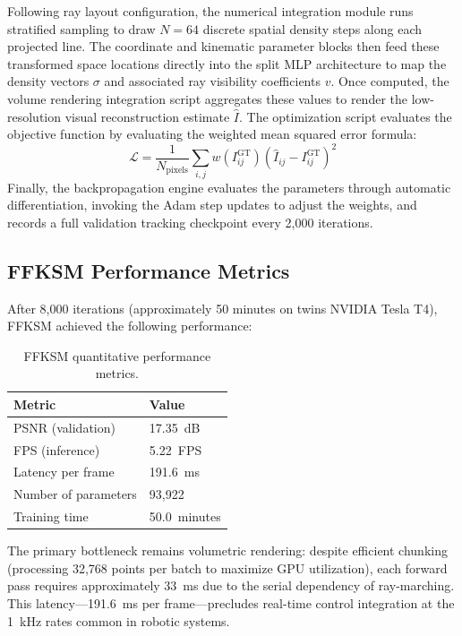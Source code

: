 \documentclass[12pt,a4paper,oneside]{report}
\begin{document}
Following ray layout configuration, the numerical integration module runs stratified sampling to draw $N=64$ discrete spatial density steps along each projected line. The coordinate and kinematic parameter blocks then feed these transformed space locations directly into the split MLP architecture to map the density vectors $\sigma$ and associated ray visibility coefficients $v$. Once computed, the volume rendering integration script aggregates these values to render the low-resolution visual reconstruction estimate $\hat{I}$. The optimization script evaluates the objective function by evaluating the weighted mean squared error formula:
\begin{equation}
\mathcal{L} = \frac{1}{N_{\text{pixels}}} \sum_{i,j} w(I_{ij}^{\text{GT}}) (\hat{I}_{ij} - I_{ij}^{\text{GT}})^2
\end{equation}
Finally, the backpropagation engine evaluates the parameters through automatic differentiation, invoking the Adam step updates to adjust the weights, and records a full validation tracking checkpoint every 2,000 iterations.

\subsection{FFKSM Performance Metrics}
After 8,000 iterations (approximately 50 minutes on twins NVIDIA Tesla T4), FFKSM achieved the following performance:
\begin{table}[H]
\centering
\caption{FFKSM quantitative performance metrics.}
\label{tab:ffksm_performance}
\begin{tabular}{ll}
\toprule
\textbf{Metric} & \textbf{Value} \\
\midrule
PSNR (validation) & 17.35~dB \\
FPS (inference) & 5.22~FPS \\
Latency per frame & 191.6~ms \\
Number of parameters & 93,922 \\
Training time & 50.0~minutes \\
\bottomrule
\end{tabular}
\end{table}

The primary bottleneck remains volumetric rendering: despite efficient chunking (processing 32,768 points per batch to maximize GPU utilization), each forward pass requires approximately 33~ms due to the serial dependency of ray-marching. This latency---191.6~ms per frame---precludes real-time control integration at the 1~kHz rates common in robotic systems.
\end{document}
